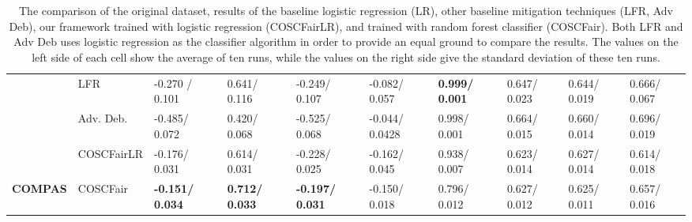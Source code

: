 \begin{table*}[h!]
\begin{small}
{\begin{minipage}{\textwidth}
\begin{tabular}{|c|l|l|l|l|l|l|l|l|l|}
                                        & LFR                                & -0.270 / 0.101         & 0.641/ 0.116          & -0.249/ 0.107          & -0.082/ 0.057          & \textbf{0.999/ 0.001} & 0.647/ 0.023          & 0.644/ 0.019          & 0.666/ 0.067          \\ \cline{2-10} 
                                        & Adv. Deb.                          & -0.485/ 0.072          & 0.420/ 0.068          & -0.525/ 0.068          & -0.044/ 0.0428         & 0.998/ 0.001          & 0.664/ 0.015          & 0.660/ 0.014          & 0.696/ 0.019          \\ \cline{2-10} 
                                        & \cellcolor[HTML]{D9D9D9}COSCFairLR & -0.176/ 0.031          & 0.614/ 0.031          & -0.228/ 0.025          & -0.162/ 0.045          & 0.938/ 0.007          & 0.623/ 0.014          & 0.627/ 0.014          & 0.614/ 0.018          \\ \cline{2-10} 
\multirow{-6}{*}{\textbf{COMPAS}}       & \cellcolor[HTML]{D9D9D9}COSCFair   & \textbf{-0.151/ 0.034} & \textbf{0.712/ 0.033} & \textbf{-0.197/ 0.031} & -0.150/ 0.018          & 0.796/ 0.012          & 0.627/ 0.012          & 0.625/ 0.011          & 0.657/ 0.016          \\ \hline
\end{tabular}
\end{minipage}}
\caption{\label{Table3} The comparison of the original dataset, results of the baseline logistic regression (LR), other baseline mitigation techniques (LFR, Adv Deb), our framework trained with logistic regression (COSCFairLR), and trained with random forest classifier (COSCFair). Both LFR and Adv Deb uses logistic regression as the classifier algorithm in order to provide an equal ground to compare the results. The values on the left side of each cell show the average of ten runs, while the values on the right side give the standard deviation of these ten runs.}
\end{small}
\vskip -0.2in
\end{table*}
